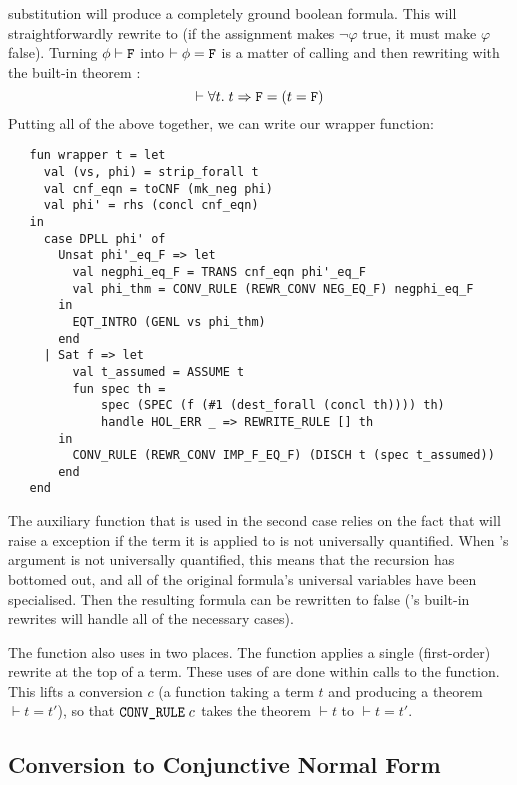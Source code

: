 substitution will produce a completely ground boolean formula.  This
will straightforwardly rewrite to  (if the assignment
makes $\neg\varphi$ true, it must make $\varphi$ false).  Turning
$\phi\vdash \holtxt{F}$ into $\vdash \phi = \holtxt{F}$ is a matter of
calling  and then rewriting with the built-in theorem
:
\[
\vdash \forall t.\;t \Rightarrow \holtxt{F} = (t = \holtxt{F})
\]
Putting all of the above together, we can write our wrapper function:
\begin{hol}
\begin{verbatim}
   fun wrapper t = let
     val (vs, phi) = strip_forall t
     val cnf_eqn = toCNF (mk_neg phi)
     val phi' = rhs (concl cnf_eqn)
   in
     case DPLL phi' of
       Unsat phi'_eq_F => let
         val negphi_eq_F = TRANS cnf_eqn phi'_eq_F
         val phi_thm = CONV_RULE (REWR_CONV NEG_EQ_F) negphi_eq_F
       in
         EQT_INTRO (GENL vs phi_thm)
       end
     | Sat f => let
         val t_assumed = ASSUME t
         fun spec th =
             spec (SPEC (f (#1 (dest_forall (concl th)))) th)
             handle HOL_ERR _ => REWRITE_RULE [] th
       in
         CONV_RULE (REWR_CONV IMP_F_EQ_F) (DISCH t (spec t_assumed))
       end
   end
\end{verbatim}
\end{hol}

The auxiliary function  that is used in the second case
relies on the fact that  will raise a 
exception if the term it is applied to is not universally quantified.
When 's argument is not universally quantified, this means
that the recursion has bottomed out, and all of the original formula's
universal variables have been specialised.  Then the resulting formula
can be rewritten to false ('s built-in rewrites will
handle all of the necessary cases).

The  function also uses  in two places.
The  function applies a single (first-order) rewrite at
the top of a term.  These uses of  are done within
calls to the  function.  This lifts a conversion $c$ (a
function taking a term $t$ and producing a theorem $\vdash t = t'$),
so that $\ml{CONV\_RULE}\;c$ takes the theorem $\vdash t$ to $\vdash
t = t'$.


\subsection{Conversion to Conjunctive Normal Form}
\label{sec:conv-conj-norm}

